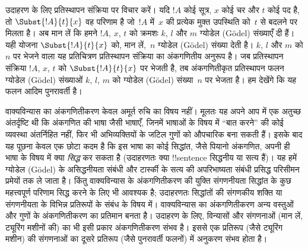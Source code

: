 \documentclass[../../../include/open-logic-section]{subfiles}
\begin{document}
उदाहरण के लिए प्रतिस्थापन संक्रिया पर विचार करें। यदि $!A$ कोई सूत्र, $x$
कोई चर और $t$ कोई पद है, तो $\Subst{!A}{t}{x}$ वह परिणाम है जो~$!A$ में~$x$
की प्रत्येक मुक्त उपस्थिति को~$t$ से बदलने पर मिलता है। अब मान लें कि हमने
$!A$, $x$, $t$ को क्रमशः $k$, $l$ और $m$ ग्योडेल (G\"odel) संख्याएँ दी हैं।
यही योजना $\Subst{!A}{t}{x}$ को, मान लें,~$n$ ग्योडेल (G\"odel) संख्या देती
है। $k$, $l$ और $m$ को $n$ पर भेजने वाला यह प्रतिचित्रण प्रतिस्थापन संक्रिया
का अंकगणितीय अनुरूप है। जब प्रतिस्थापन संक्रिया $!A$, $x$, $t$ को
$\Subst{!A}{t}{x}$ पर भेजती है, तब अंकगणितीकृत प्रतिस्थापन फलन ग्योडेल (G\"odel)
 संख्याओं $k$, $l$, $m$ को ग्योडेल (G\"odel) संख्या~$n$ पर भेजता
है। हम देखेंगे कि यह फलन आदिम पुनरावर्ती है।

वाक्यविन्यास का अंकगणितीकरण केवल अमूर्त रुचि का विषय नहीं। मूलतः यह अपने आप
में एक अतुच्छ अंतर्दृष्टि थी कि अंकगणित की भाषा जैसी भाषाएँ, जिनमें भाषाओं के
विषय में ``बात करने'' की कोई व्यवस्था अंतर्निहित नहीं, फिर भी अभिव्यक्तियों
के जटिल गुणों को औपचारिक बना सकती हैं। इसके बाद यह पूछना केवल एक छोटा कदम है
कि इस भाषा का कोई सिद्धांत, जैसे पियानो अंकगणित, अपनी ही भाषा के विषय में
क्या \emph{सिद्ध} कर सकता है (उदाहरणतः क्या !!{sentence} सिद्धनीय या सत्य
हैं)। यह हमें ग्योडेल (G\"odel) के असिद्धनीयता संबंधी और टार्स्की के सत्य की
अपरिभाष्यता संबंधी प्रसिद्ध परिसीमन प्रमेयों तक ले जाता है। किंतु वाक्यविन्यास
के अंकगणितीकरण की युक्ति संगणनीयता सिद्धांत के कुछ महत्त्वपूर्ण परिणाम सिद्ध
करने के लिए भी आवश्यक है; उदाहरणतः सिद्धांतों की संगणकीय शक्ति या संगणनीयता
के विभिन्न प्रतिरूपों के संबंध के विषय में। वाक्यविन्यास का अंकगणितीकरण अन्य
वस्तुओं और गुणों के अंकगणितीकरण का प्रतिमान बनता है। उदाहरण के लिए, विन्यासों
और संगणनाओं (मान लें, ट्यूरिंग मशीनों की) का भी इसी प्रकार अंकगणितीकरण संभव
है। इससे एक प्रतिरूप (जैसे ट्यूरिंग मशीन) की संगणनाओं का दूसरे प्रतिरूप (जैसे
पुनरावर्ती फलनों) में अनुकरण संभव होता है।
\end{document}
